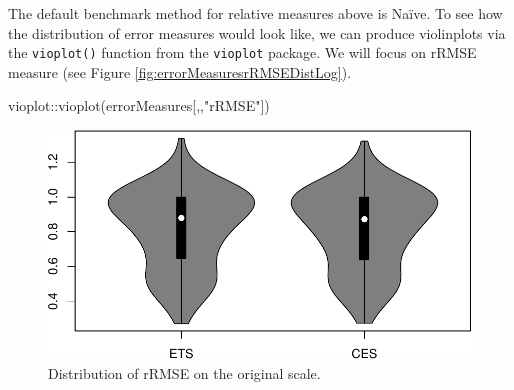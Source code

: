 \documentclass[
]{book}
\newenvironment{Shaded}{\begin{snugshade}}{\end{snugshade}}
\newcommand{\AttributeTok}[1]{\textcolor[rgb]{0.77,0.63,0.00}{#1}}
\newcommand{\CommentTok}[1]{\textcolor[rgb]{0.56,0.35,0.01}{\textit{#1}}}
\newcommand{\ConstantTok}[1]{\textcolor[rgb]{0.00,0.00,0.00}{#1}}
\newcommand{\DecValTok}[1]{\textcolor[rgb]{0.00,0.00,0.81}{#1}}
\newcommand{\FunctionTok}[1]{\textcolor[rgb]{0.00,0.00,0.00}{#1}}
\newcommand{\NormalTok}[1]{#1}
\newcommand{\OtherTok}[1]{\textcolor[rgb]{0.56,0.35,0.01}{#1}}
\newcommand{\SpecialCharTok}[1]{\textcolor[rgb]{0.00,0.00,0.00}{#1}}
\newcommand{\StringTok}[1]{\textcolor[rgb]{0.31,0.60,0.02}{#1}}
\theoremstyle{definition}
\theoremstyle{definition}
\theoremstyle{definition}
\theoremstyle{definition}
\theoremstyle{remark}
\begin{document}
\begin{Shaded}
\end{Shaded}

The default benchmark method for relative measures above is Naïve. To see how the distribution of error measures would look like, we can produce violinplots via the \texttt{vioplot()} function from the \texttt{vioplot} package. We will focus on rRMSE measure (see Figure \ref{fig:errorMeasuresrRMSEDistLog}).

\begin{Shaded}
\begin{Highlighting}[]
\NormalTok{vioplot}\SpecialCharTok{::}\FunctionTok{vioplot}\NormalTok{(errorMeasures[,,}\StringTok{"rRMSE"}\NormalTok{])}
\end{Highlighting}
\end{Shaded}

\begin{figure}
\centering
\includegraphics{Svetunkov--2022----ADAM_files/figure-latex/errorMeasuresrRMSEDist-1.pdf}
\caption{\label{fig:errorMeasuresrRMSEDist}Distribution of rRMSE on the original scale.}
\end{figure}
\end{document}
